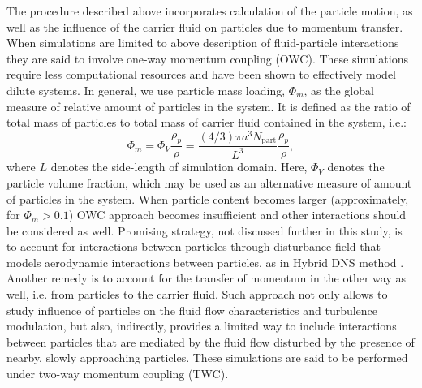 \documentclass{pracamgren}
\begin{document}
The procedure described above incorporates calculation of the particle motion, as well as the influence of the carrier fluid on particles due to momentum transfer.
When simulations are limited to above description of fluid-particle interactions they are said to involve one-way momentum coupling (OWC).
These simulations require less computational resources and have been shown to effectively model dilute systems.
In general, we use particle mass loading, $\Phi_{m}$, as the global measure of relative amount of particles in the system.
It is defined as the ratio of total mass of particles to total mass of carrier fluid contained in the system, i.e.:
\begin{equation}
\Phi_m = \Phi_V \frac{\rho_p}{\rho} = \frac{(4/3) \pi a^3 N_{\text{part}}}{L^3} \frac{\rho_p}{\rho} ,
\label{eqn:phim}
\end{equation}
where $L$ denotes the side-length of simulation domain.
Here, $\Phi_V$ denotes the particle volume fraction, which may be used as an alternative measure of amount of particles in the system.
When particle content becomes larger (approximately, for $\Phi_m > 0.1$) OWC approach becomes insufficient and other interactions should be considered as well.
Promising strategy, not discussed further in this study, is to account for interactions between particles through disturbance field that models aerodynamic interactions between particles, as in Hybrid DNS method \parencite[see e.g.][]{Ayala2014}.
Another remedy is to account for the transfer of momentum in the other way as well, i.e. from particles to the carrier fluid.
Such approach not only allows to study influence of particles on the fluid flow characteristics and turbulence modulation, but also, indirectly, provides a limited way to include interactions between particles that are mediated by the fluid flow disturbed by the presence of nearby, slowly approaching particles.
These simulations are said to be performed under two-way momentum coupling (TWC).
\end{document}
